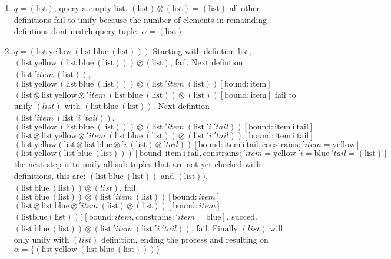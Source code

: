 \documentclass[11pt,a4paper]{report}
\newcommand{\var}[1]{'#1}
\newcommand{\unify}{\otimes}
\begin{document}
\begin{enumerate}
\item $q = (\text{list})$, query a empty list.
\subitem $(\text{list}) \unify (\text{list}) = (\text{list})$
\subitem all other definitions fail to unify because the number of elements in remainding defintions dont match query tuple.
\subitem $\alpha = {(\text{list})}$
\item $q = (\text{list}\ \text{yellow}\ (\text{list}\ \text{blue}\ (\text{list})))$
\subitem Starting with defintion $\text{list}$,
\subitem $(\text{list}\ \text{yellow}\ (\text{list}\ \text{blue}\ (\text{list}))) \unify (\text{list})$, fail.
\subitem Next defintion $(\text{list}\ \var{item}\ (\text{list}))$,
\subitem $(\text{list}\ \text{yellow}\ (\text{list}\ \text{blue}\ (\text{list}))) \unify (\text{list}\ \var{item}\ (\text{list}))[\text{bound}: \text{item} ]$
\subitem $(\text{list} \unify \text{list}\ \text{yellow} \unify \var{item}\ (\text{list}\ \text{blue}\ (\text{list})) \unify (\text{list}))[\text{bound}: \text{item}]$
\subitem fail to unify $(list)$ with $(\text{list}\ \text{blue}\ (\text{list}))$.
\subitem Next defintion $(\text{list}\ \var{item}\ (\text{list}\ \var{i}\ \var{tail}))$,
\subitem $(\text{list}\ \text{yellow}\ (\text{list}\ \text{blue}\ (\text{list}))) \unify (\text{list}\ \var{item}\ (\text{list}\ \var{i}\ \var{tail}))[\text{bound}: \text{item}\ \text{i}\ \text{tail}]$
\subitem $(\text{list}\unify \text{list}\ \text{yellow} \unify \var{item}\ (\text{list}\ \text{blue}\ (\text{list})) \unify (\text{list}\ \var{i}\ \var{tail}))[\text{bound}: \text{item}\ \text{i}\ \text{tail}]$
\subitem $(\text{list}\ \text{yellow} (\text{list}\unify \text{list}\ \text{blue} \unify \var{i}\ (\text{list}) \unify \var{tail}))[\text{bound}: \text{item}\ \text{i}\ \text{tail}, \text{constrains}: \var{item} = \text{yellow}]$
\subitem $(\text{list}\ \text{yellow} (\text{list}\ \text{blue}\ (\text{list})))
[\text{bound}: \text{item}\ \text{i}\ \text{tail}, \text{constrains}: \var{item} = \text{yellow}\ \var{i}=\text{blue}\ \var{tail}=(\text{list})]$
\subitem the next step is to unify all sub-tuples that are not yet checked with definitions, this are: $(\text{list}\ \text{blue}\ (\text{list}))$ and $(\text{list}))$,
\subitem $(\text{list}\ \text{blue}\ (\text{list})) \unify (list)$, fail.
\subitem $(\text{list}\ \text{blue}\ (\text{list})) \unify (\text{list}\ \var{item}\ (\text{list}))[\text{bound}: item]$
\subitem $(\text{list}\unify \text{list}\ \text{blue}\unify \var{item}\ (\text{list}) \unify (\text{list}))[\text{bound}: item]$
\subitem $(\text{list} \text{blue} (\text{list})))[\text{bound}: item, \text{constrains}: \var{item}=\text{blue}]$, succed.
\subitem $(\text{list}\ \text{blue}\ (\text{list})) \unify (\text{list}\ \var{item}\ (\text{list}\ \var{i}\ \var{tail}))$, fail.
\subitem Finally $(list)$ will only unify with $(list)$ definition, ending the process and resulting on $\alpha = \{ (\text{list}\ \text{yellow}\ (\text{list}\ \text{blue}\ (\text{list}))) \}$
\end{enumerate}
\end{document}
